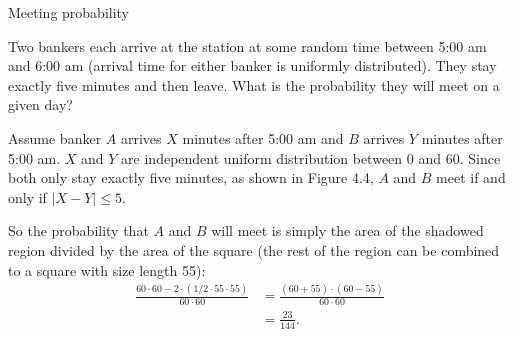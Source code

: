 \begin{problem}{Meeting probability}

Two bankers each arrive at the station at some random time between 5:00 am and 6:00 am (arrival time for either banker is uniformly distributed). They stay exactly five minutes and then leave. What is the probability they will meet on a given day?

\end{problem}
\begin{solution}
Assume banker \(A\) arrives \(X\) minutes after 5:00 am and \(B\) arrives \(Y\) minutes after 5:00 am. \(X\) and \(Y\) are independent uniform distribution between 0 and 60. Since both only stay exactly five minutes, as shown in Figure 4.4, \(A\) and \(B\) meet if and only if \(\lvert X-Y\rvert\le5\).

So the probability that \(A\) and \(B\) will meet is simply the area of the shadowed region divided by the area of the square (the rest of the region can be combined to a square with size length 55):
\[
\begin{aligned}
\frac{60\cdot60-2\cdot(1/2\cdot55\cdot55)}{60\cdot60}
&=\frac{(60+55)\cdot(60-55)}{60\cdot60}\\
&=\frac{23}{144}.
\end{aligned}
\]
\end{solution}
